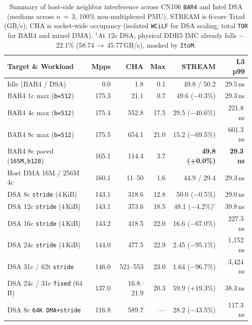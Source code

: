 \begin{table}[t]
  \centering
  \scriptsize
  \setlength{\tabcolsep}{2.2pt}
  \begin{tabular}{@{}lrrrrr@{}}
    \toprule
    \textbf{Target \& Workload} & \textbf{Mpps} & \textbf{CHA} & \textbf{Max} & \textbf{STREAM} & \textbf{L3 p99} \\
    \midrule
    Idle (BAR4 / DSA) & 0.0 & 1.8 & 0.1 & 49.8 / 50.2 & 29.5\,ns \\
    BAR4 1c max (\texttt{b=512}) & 175.3 & 21.1 & 0.7 & 49.6 ($-$0.3\%) & 29.3\,ns \\
    BAR4 4c max (\texttt{b=512}) & 175.4 & 552.8 & 17.5 & 29.5 ($-$40.6\%) & 221.8\,ns \\
    BAR4 8c max (\texttt{b=512}) & 175.5 & 654.1 & 21.0 & 15.2 ($-$69.5\%) & 601.3\,ns \\
    BAR4 8c paced (\texttt{165M,b128}) & 165.1 & 114.4 & 3.7 & \textbf{49.8 (+0.0\%)} & \textbf{29.3\,ns} \\
    Host DMA 16M / 256M 4c & 160.1 & 11--50 & 1.6 & 44.9 / 29.4 & 29.3\,ns \\
    \midrule
    DSA 8c \texttt{stride} (4\,KiB) & 143.1 & 318.6 & 12.8 & 50.0 ($-$0.5\%) & 29.0\,ns \\
    DSA 12c \texttt{stride} (4\,KiB) & 143.1 & 373.6 & 18.5 & 48.1 ($-$4.2\%)$^\dagger$ & 39.8\,ns \\
    DSA 16c \texttt{stride} (4\,KiB) & 143.2 & 418.5 & 22.0 & 16.6 ($-$67.0\%) & 227.3\,ns \\
    DSA 24c \texttt{stride} (4\,KiB) & 144.0 & 477.5 & 22.9 & 2.45 ($-$95.1\%) & 1,152\,ns \\
    DSA 31c / 62t \texttt{stride} & 146.0 & 521--553 & 23.0 & 1.64 ($-$96.7\%) & 3,424\,ns \\
    DSA 24c / 31c \texttt{fixed} (64\,B) & 137.0 & 16.8--21.9 & 20.3 & 59.9 (+19.3\%) & 38.3\,ns \\
    DSA 8c \texttt{64K DMA+stride} & 116.8 & 589.7 & --- & 28.2 ($-$43.5\%) & 117.3\,ns \\
    \bottomrule
  \end{tabular}
  \caption{Summary of host-side neighbor interference across CN106 \texttt{BAR4} and Intel DSA (medians across $n\,=\,3$, 100\% non-multiplexed PMU). STREAM is 6-core Triad (GB/s); CHA is socket-wide occupancy (isolated \texttt{WCiLF} for DSA scaling, total \texttt{TOR} for BAR4 and mixed DMA). $^\dagger$At 12c DSA, physical DDR5 IMC already falls $-$22.1\% (58.74\,$\to$\,45.77\,GB/s), masked by \texttt{ItoM}.}
  \label{tab:host_tor}
\end{table}

